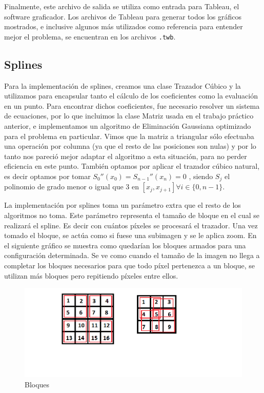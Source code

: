 \documentclass{article}
\begin{document}
Finalmente, este archivo de salida se utiliza como entrada para Tableau, el software graficador. Los archivos de Tableau para generar todos los gráficos mostrados, e inclusive algunos más utilizados como referencia para entender mejor el problema, se encuentran en los archivos \texttt{.twb}.

\subsection{Splines}

Para la implementación de splines, creamos una clase Trazador Cúbico y la utilizamos para encapsular tanto el cálculo de los coeficientes como la evaluación en un punto. Para encontrar dichos coeficientes, fue necesario resolver un sistema de ecuaciones, por lo que incluimos la clase Matriz usada en el trabajo práctico anterior, e implementamos un algoritmo de Eliminación Gaussiana optimizado para el problema en particular. Vimos que la matriz a triangular sólo efectuaba una operación por columna (ya que el resto de las posiciones son nulas) y por lo tanto nos pareció mejor adaptar el algoritmo a esta situación, para no perder eficiencia en este punto. También optamos por aplicar el trazador cúbico natural, es decir optamos por tomar $S_{0}''(x_{0})= S_{n-1}'' (x_{n}) = 0$ , siendo $S_{j}$ el polinomio de grado menor o igual que 3 en $[x_{j},x_{j+1}] \forall i \in \{0, n-1\}$.

La implementación por splines toma un parámetro extra que el resto de los algoritmos no toma. Este parámetro representa el tamaño de bloque en el cual se realizará el spline. Es decir con cuántos píxeles se procesará el trazador. Una vez tomado el bloque, se actúa como si fuese una subimagen y se le aplica zoom. En el siguiente gráfico se muestra como quedarían los bloques armados para una configuración determinada. Se ve como cuando el tamaño de la imagen no llega a completar los bloques necesarios para que todo píxel pertenezca a un bloque, se utilizan más bloques pero repitiendo píxeles entre ellos.

\begin{figure}[H]
  \includegraphics[width=\linewidth]{Bloques}
  \caption{Bloques}\label{fig:Bloques}
\end{figure}
\end{document}
